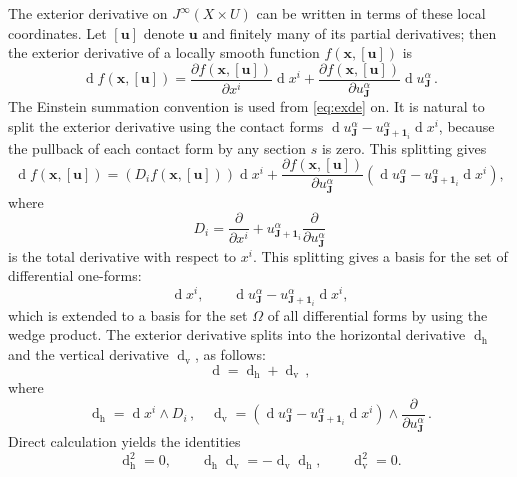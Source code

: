 \documentclass[11pt]{article} %
\numberwithin{equation}{section}
\newcommand{\upd}{\operatorname{d}}
\newcommand{\uph}{\operatorname{h}}
\newcommand{\upv}{\operatorname{v}}
\newcommand{\dv}{\upd_{\upv}\!}
\newcommand{\mbu}{\mathbf{u}}
\newcommand{\mbx}{\mathbf{x}}
\newcommand{\mbJ}{\mathbf{J}}
\theoremstyle{plain}
\theoremstyle{definition}
\begin{document}
The exterior derivative on $J^{\infty}(X\times U)$ can be written in terms of these local coordinates. Let $[\mbu]$ denote $\mbu$ and finitely many of its partial derivatives; then the exterior derivative of a locally smooth function $f(\mbx,[\mbu])$ is
\begin{equation}\label{eq:exde}
\upd\!f(\mbx,[\mbu])=\frac{\partial f(\mbx,[\mbu])}{\partial x^i}\upd\!x^i+\frac{\partial f(\mbx,[\mbu])}{\partial u^{\alpha}_{\mbJ}}\upd\! u^{\alpha}_{\mbJ}\,.
\end{equation}
The Einstein summation convention is used from \eqref{eq:exde} on. It is natural to split the exterior derivative using the contact forms $\upd\!u^{\alpha}_{\mbJ}-u^{\alpha}_{\mbJ+\mathbf{1}_i}\upd\!x^i$, because the pullback of each contact form  by any section $s$ is zero. This splitting gives
\begin{equation}\label{eq:mexde}
\upd\!f(\mbx,[\mbu])=\left(D_if(\mbx,[\mbu])\right)\upd\!x^i+\frac{\partial f(\mbx,[\mbu])}{\partial u^{\alpha}_{\mbJ}}\left(\upd\!u^{\alpha}_{\mbJ}-u^{\alpha}_{\mbJ+\mathbf{1}_i}\upd\!x^i\right),
\end{equation}
where
\begin{equation}
D_i=\frac{\partial}{\partial x^i}+u_{\mbJ+\mathbf{1}_i}^{\alpha}\frac{\partial}{\partial u_{\mbJ}^{\alpha}}
\end{equation}
is the total derivative with respect to $x^i$.  This splitting gives a basis for the set of differential one-forms: 
\begin{equation}\label{eq:dxdu}
\upd\!x^i,\qquad \upd\!u^{\alpha}_{\mbJ}-u^{\alpha}_{\mbJ+\mathbf{1}_i}\upd\!x^i,
\end{equation}
which is extended to a basis for the set $\Omega$ of all differential forms by using the wedge product. 
The exterior derivative splits into the horizontal derivative $\upd_{\uph}$ and the vertical derivative $\dv $, as follows:
\begin{equation}
\upd=\upd_{\uph}+\dv\, ,
\end{equation}
where
\begin{equation}\label{eq:dhdiff}
\upd_{\uph}=\upd\!x^i\wedge D_i\,,\quad \dv =\left(\upd\!u^{\alpha}_{\mbJ}-u^{\alpha}_{\mbJ+\mathbf{1}_i}\!\upd\!x^i\right)\wedge\frac{\partial}{\partial u^{\alpha}_{\mbJ}}\,.
\end{equation}
Direct calculation yields the identities 
\begin{equation}\label{eq:diffdhdv}
\upd_{\uph}^2=0,\qquad \upd_{\uph}\!\dv =-\dv \upd_{\uph},\qquad \upd_{\upv}^2=0.
\end{equation}
\end{document}
